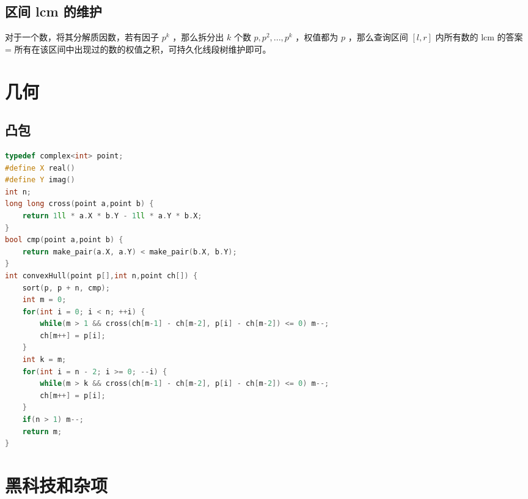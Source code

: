 \documentclass{article}
\begin{document}
\begin{CJK}{UTF8}{song}
\subsection{区间 lcm 的维护}
对于一个数，将其分解质因数，若有因子 $p^k$ ，那么拆分出 $k$ 个数 $p, p^2, ..., p^k$ ，权值都为 $p$ ，那么查询区间 $[l, r]$ 内所有数的 lcm 的答案 = 所有在该区间中出现过的数的权值之积，可持久化线段树维护即可。
\newpage
\section{几何}
\subsection{凸包}
\begin{lstlisting}[language=C++]
typedef complex<int> point;
#define X real()
#define Y imag()
int n;
long long cross(point a,point b) {
	return 1ll * a.X * b.Y - 1ll * a.Y * b.X;
}
bool cmp(point a,point b) {
	return make_pair(a.X, a.Y) < make_pair(b.X, b.Y);
}
int convexHull(point p[],int n,point ch[]) {
	sort(p, p + n, cmp);
	int m = 0;
	for(int i = 0; i < n; ++i) {
		while(m > 1 && cross(ch[m-1] - ch[m-2], p[i] - ch[m-2]) <= 0) m--;
		ch[m++] = p[i];
	}
	int k = m;
	for(int i = n - 2; i >= 0; --i) {
		while(m > k && cross(ch[m-1] - ch[m-2], p[i] - ch[m-2]) <= 0) m--;
		ch[m++] = p[i];
	}
	if(n > 1) m--;
	return m;
}
\end{lstlisting}
\section{黑科技和杂项}

\end{CJK}
\end{document}
